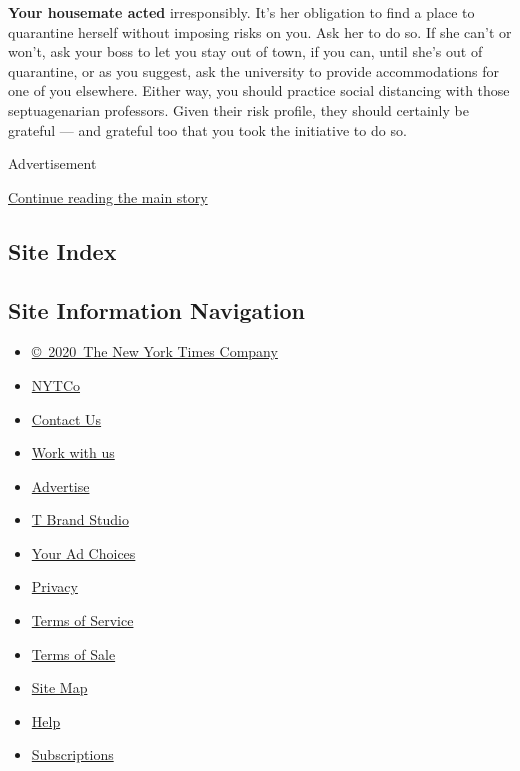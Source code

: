 \textbf{Your housemate acted} irresponsibly. It's her obligation to find
a place to quarantine herself without imposing risks on you. Ask her to
do so. If she can't or won't, ask your boss to let you stay out of town,
if you can, until she's out of quarantine, or as you suggest, ask the
university to provide accommodations for one of you elsewhere. Either
way, you should practice social distancing with those septuagenarian
professors. Given their risk profile, they should certainly be grateful
--- and grateful too that you took the initiative to do so.

Advertisement

\protect\hyperlink{after-bottom}{Continue reading the main story}

\hypertarget{site-index}{%
\subsection{Site Index}\label{site-index}}

\hypertarget{site-information-navigation}{%
\subsection{Site Information
Navigation}\label{site-information-navigation}}

\begin{itemize}
\tightlist
\item
  \href{https://help.nytimes3xbfgragh.onion/hc/en-us/articles/115014792127-Copyright-notice}{©~2020~The
  New York Times Company}
\end{itemize}

\begin{itemize}
\tightlist
\item
  \href{https://www.nytco.com/}{NYTCo}
\item
  \href{https://help.nytimes3xbfgragh.onion/hc/en-us/articles/115015385887-Contact-Us}{Contact
  Us}
\item
  \href{https://www.nytco.com/careers/}{Work with us}
\item
  \href{https://nytmediakit.com/}{Advertise}
\item
  \href{http://www.tbrandstudio.com/}{T Brand Studio}
\item
  \href{https://www.nytimes3xbfgragh.onion/privacy/cookie-policy\#how-do-i-manage-trackers}{Your
  Ad Choices}
\item
  \href{https://www.nytimes3xbfgragh.onion/privacy}{Privacy}
\item
  \href{https://help.nytimes3xbfgragh.onion/hc/en-us/articles/115014893428-Terms-of-service}{Terms
  of Service}
\item
  \href{https://help.nytimes3xbfgragh.onion/hc/en-us/articles/115014893968-Terms-of-sale}{Terms
  of Sale}
\item
  \href{https://spiderbites.nytimes3xbfgragh.onion}{Site Map}
\item
  \href{https://help.nytimes3xbfgragh.onion/hc/en-us}{Help}
\item
  \href{https://www.nytimes3xbfgragh.onion/subscription?campaignId=37WXW}{Subscriptions}
\end{itemize}
